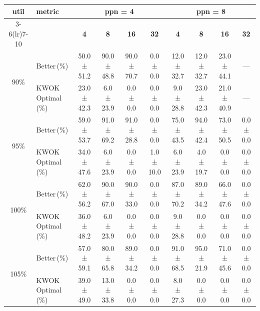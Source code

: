 \begin{tabular}{@{}c l *{8}{c}@{}}
\toprule
\multirow{2}{*}{\textbf{util}} & \multirow{2}{*}{\textbf{metric}} &\multicolumn{4}{c}{\textbf{ppn = 4}} & \multicolumn{4}{c}{\textbf{ppn = 8}}\\
\cmidrule(lr){3-6}\cmidrule(lr){7-10}
 &  & \textbf{4} & \textbf{8} & \textbf{16} & \textbf{32} & \textbf{4} & \textbf{8} & \textbf{16} & \textbf{32}\\
\midrule
\multirow{2}{*}{90\%}
& Better\,(\%) & 50.0 ± 51.2 & 90.0 ± 48.8 & 90.0 ± 70.7 & 0.0 ± 0.0 & 12.0 ± 32.7 & 12.0 ± 32.7 & 23.0 ± 44.1 & \multicolumn{1}{c}{—} \\
& KWOK\,Optimal\,(\%) & 23.0 ± 42.3 & 6.0 ± 23.9 & 0.0 ± 0.0 & 0.0 ± 0.0 & 9.0 ± 28.8 & 23.0 ± 42.3 & 21.0 ± 40.9 & \multicolumn{1}{c}{—} \\
\midrule
\multirow{2}{*}{95\%}
& Better\,(\%) & 59.0 ± 53.7 & 91.0 ± 69.2 & 91.0 ± 28.8 & 0.0 ± 0.0 & 75.0 ± 43.5 & 94.0 ± 42.4 & 73.0 ± 50.5 & 0.0 ± 0.0 \\
& KWOK\,Optimal\,(\%) & 34.0 ± 47.6 & 6.0 ± 23.9 & 0.0 ± 0.0 & 1.0 ± 10.0 & 6.0 ± 23.9 & 4.0 ± 19.7 & 0.0 ± 0.0 & 0.0 ± 0.0 \\
\midrule
\multirow{2}{*}{100\%}
& Better\,(\%) & 62.0 ± 56.2 & 90.0 ± 67.0 & 90.0 ± 33.0 & 0.0 ± 0.0 & 87.0 ± 70.2 & 89.0 ± 34.2 & 66.0 ± 47.6 & 0.0 ± 0.0 \\
& KWOK\,Optimal\,(\%) & 36.0 ± 48.2 & 6.0 ± 23.9 & 0.0 ± 0.0 & 0.0 ± 0.0 & 9.0 ± 28.8 & 0.0 ± 0.0 & 0.0 ± 0.0 & 0.0 ± 0.0 \\
\midrule
\multirow{2}{*}{105\%}
& Better\,(\%) & 57.0 ± 59.1 & 80.0 ± 65.8 & 89.0 ± 34.2 & 0.0 ± 0.0 & 91.0 ± 68.5 & 95.0 ± 21.9 & 71.0 ± 45.6 & 0.0 ± 0.0 \\
& KWOK\,Optimal\,(\%) & 39.0 ± 49.0 & 13.0 ± 33.8 & 0.0 ± 0.0 & 0.0 ± 0.0 & 8.0 ± 27.3 & 0.0 ± 0.0 & 0.0 ± 0.0 & 0.0 ± 0.0 \\
\bottomrule
\end{tabular}
